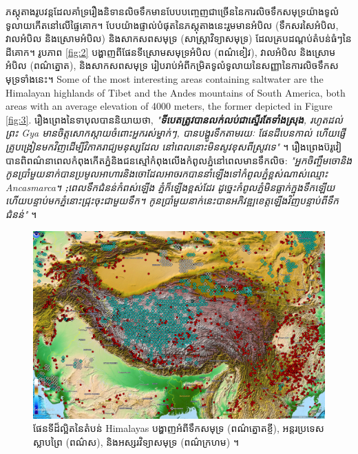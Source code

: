 \documentclass[10pt,twocolumn,letterpaper]{article}
\begin{document}
ភស្តុតាងរូបវន្តដែលគាំទ្ររឿងនិទានលិចទឹកមានបែបបញ្ចេញជាច្រើននៃការលិចទឹកសមុទ្រយ៉ាងទូលំទូលាយកើតនៅលើផ្ទៃគោក។ បែបយ៉ាងផ្ទាល់បំផុតនៃភស្តុតាងនេះរួមមានអំបិល (ទឹកសរសៃអំបិល, វាលអំបិល និងស្រោមអំបិល) និងសាកសពសមុទ្រ (សាស្ត្រាវិទ្យាសមុទ្រ) ដែលគ្របដណ្តប់តំបន់ធំៗនៃដីគោក។ រូបភាព \ref{fig:2} បង្ហាញពីផែនទីស្រោមសមុទ្រអំបិល (ពណ៌ខៀវ), វាលអំបិល និងស្រោមអំបិល (ពណ៌ត្នោត), និងសាកសពសមុទ្រ \cite{15,16,86,87} រៀបរាប់អំពីកម្រិតទូលំទូលាយនៃសញ្ញានៃការលិចទឹកសមុទ្រទាំងនេះ។
Some of the most interesting areas containing saltwater are the Himalayan highlands of Tibet and the Andes mountains of South America, both areas with an average elevation of 4000 meters, the former depicted in Figure \ref{fig:3}. រឿងព្រេងនៃទាបុលបាននិយាយថា, \textit{"\textbf{ទីបេតត្រូវបានលក់លប់ជា​ស្ទើរតែទាំងស្រុង}, រហូតដល់ព្រះ Gya មានចិត្តសោកស្តាយចំពោះអ្នករស់ម្នាក់ៗ, បានបង្ហូរទឹកតាមរយៈ ផែនដីបេនកាល់ ហើយផ្ញើគ្រូបង្រៀនមកវិញដើម្បីវិភាគរាជ្យមនុស្សដែល នៅពេលនោះមិនសូវខុសពីស្រូវទេ"} \cite{3}។ រឿងព្រេងប៊រូវៀបានពិពណ៌នាពេលកំពុងកើតភ្នំនិងជនស្មៅកំពុងលើងកំពូលភ្នំនៅពេលមានទឹកលិច: \textit{"អ្នកចិញ្ចឹមចោនិងកូនប្រាំមួយនាក់បានប្រមូលអាហារនិងចោដែលអាចរកបាននាំឡើងទៅកំពូលភ្នំខ្ពស់ណាស់ឈ្មោះ Ancasmarca។ \textbf;{ពេលទឹកជំនន់កំពស់ឡើង​ ភ្នំក៏ឡើងខ្ពស់ដែរ ដូច្នេះកំពូលភ្នំមិនធ្លាក់ក្នុងទឹកឡើយ ហើយបន្ទាប់មកភ្នំនោះជ្រុះចុះជាមួយទឹក។} កូនប្រាំមួយនាក់នេះបានអភិវឌ្ឍខេត្តឡើងវិញបន្ទាប់ពីទឹកជំនន់"} \cite{3}។ 

\begin{figure}[t]
\begin{center}
   \includegraphics[width=1\linewidth]{tibet.jpg}
\end{center}
   \caption{ផែនទីដ៏ល្អិតនៃតំបន់ Himalayas បង្ហាញអំពីទឹកសមុទ្រ (ពណ៌ត្នោតខ្ចី), អន្ដរប្រទេសស្លាបព្រៃ (ពណ៌ស), និងអស្សរវិទ្យាសមុទ្រ (ពណ៌ក្រហម) \cite{15,16,86,87}។}
\label{fig:3}
\label{fig:onecol}
\end{figure}
\end{document}
